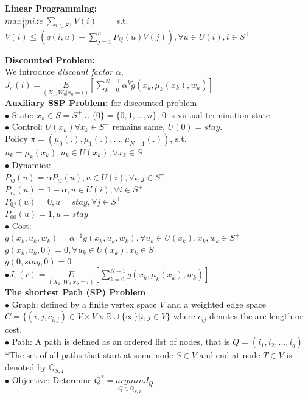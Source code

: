 \documentclass[10pt,landscape]{article}
\begin{document}
\begin{multicols*}{4}
\textbf{Linear Programming: }\\
$\underset{V}{maximize} \ \sum_{i\in S^{+}} V(i) \qquad  $ s.t.\\
$V(i) \leq (q(i,u) + \sum_{j=1}^{n} P_{ij} (u) V(j)), \forall u \in U(i), i \in S^{+}$

\textbf{Discounted Problem: }\\
We introduce \textit{discount factor} $\alpha$,\\
$J_{\pi}(i) = \underset{(X_1,W_0|x_0=i)}{E}[\sum_{k=0}^{N-1} \alpha ^k \tilde{g}(x_k,\mu_k(x_k),w_k)]$\\

\textbf{Auxiliary SSP Problem: } for discounted problem\\
$\bullet$ State: $x_k \in S = S^{+} \cup \{0\} = \{0,1,...,n\}$, 0 is virtual termination state\\
$\bullet$ Control: $U(x_k) \forall x_k \in S^{+}$ remains same, $U(0) = {stay}$.\\
Policy $\pi = (\mu_0(.), \mu_1(.),...,\mu_{N-1} (.))$, s.t. $u_k=\mu_k(x_k), u_k \in U(x_k), \forall x_k \in S$ \\
$\bullet$ Dynamics: \\
$P_{ij}(u) = \alpha \tilde{P}_{ij}(u), u \in U(i), \forall i,j \in S^{+}$\\
$P_{i0}(u) = 1 - \alpha , u \in U(i), \forall i \in S^{+}$\\
$P_{0j}(u) = 0, u = stay, \forall j \in S^{+}$\\
$P_{00}(u) = 1, u = stay$\\
$\bullet$ Cost:\\
$g(x_k,u_k,w_k) = \alpha ^ {-1} \tilde{g}(x_k,u_k,w_k), \forall u_k\in U(x_k),  x_k,w_k \in S^{+}$\\
$g(x_k,u_k,0) = 0, \forall u_k\in U(x_k),  x_k \in S^{+}$\\
$g(0,stay,0)=0$\\
$\bullet$$J_{\pi}(r) = \underset{(X_1,W_0|x_0=i)}{E}[\sum_{k=0}^{N-1} g(x_k,\mu_k(x_k),w_k)]$\\

\textbf{The shortest Path (SP) Problem}\\
$\bullet$ Graph:
defined by a finite vertex space $V$ and a weighted edge space $C = \{(i,j,c_{i,j})\in V \times V \times  \mathbb{R} \cup \{\infty \} | i,j\in V \}$ where $c_{ij}$ denotes the arc length or cost.\\
$\bullet$ Path: A path is defined as an ordered list of nodes, that is $Q=(i_1,i_2,...,i_q)$\\
*The set of all paths that start at some node $S\in V$ and end at node $T\in V$ is denoted by $\mathbb{Q}_{S,T}$.\\
$\bullet$ Objective: Determine $Q^{*} = \underset{Q\in \mathbb{Q}_{S,T}}{argmin} J_Q$


\end{multicols*}
\end{document}
